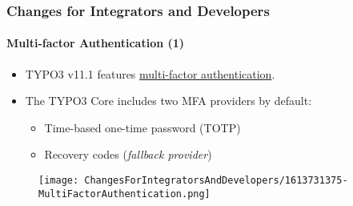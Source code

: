 %

\begin{frame}[fragile]
	\frametitle{Changes for Integrators and Developers}
	\framesubtitle{Multi-factor Authentication (1)}


	\begin{itemize}
		\item TYPO3 v11.1 features
			\href{https://en.wikipedia.org/wiki/Multi-factor_authentication}{multi-factor authentication}.
		\item The TYPO3 Core includes two MFA providers by default:

			\begin{itemize}
				\item Time-based one-time password (TOTP)
				\item Recovery codes (\textit{fallback provider})
			\end{itemize}

	\end{itemize}

	\begin{figure}
		\texttt{[image: ChangesForIntegratorsAndDevelopers/1613731375-MultiFactorAuthentication.png]}
	\end{figure}

\end{frame}

